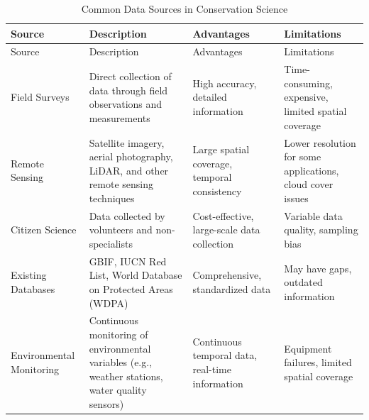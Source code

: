 \documentclass[
  letterpaper,
]{book}
\begin{document}
\begin{longtable}[]{@{}
  >{\raggedright\arraybackslash}p{}
  >{\raggedright\arraybackslash}p{}
  >{\raggedright\arraybackslash}p{}
  >{\raggedright\arraybackslash}p{}@{}}
\caption{Common Data Sources in Conservation Science}\tabularnewline
\toprule\noalign{}
\begin{minipage}[b]{\linewidth}\raggedright
Source
\end{minipage} & \begin{minipage}[b]{\linewidth}\raggedright
Description
\end{minipage} & \begin{minipage}[b]{\linewidth}\raggedright
Advantages
\end{minipage} & \begin{minipage}[b]{\linewidth}\raggedright
Limitations
\end{minipage} \\
\midrule\noalign{}
\endfirsthead
\toprule\noalign{}
\begin{minipage}[b]{\linewidth}\raggedright
Source
\end{minipage} & \begin{minipage}[b]{\linewidth}\raggedright
Description
\end{minipage} & \begin{minipage}[b]{\linewidth}\raggedright
Advantages
\end{minipage} & \begin{minipage}[b]{\linewidth}\raggedright
Limitations
\end{minipage} \\
\midrule\noalign{}
\endhead
\bottomrule\noalign{}
\endlastfoot
Field Surveys & Direct collection of data through field observations and
measurements & High accuracy, detailed information & Time-consuming,
expensive, limited spatial coverage \\
Remote Sensing & Satellite imagery, aerial photography, LiDAR, and other
remote sensing techniques & Large spatial coverage, temporal consistency
& Lower resolution for some applications, cloud cover issues \\
Citizen Science & Data collected by volunteers and non-specialists &
Cost-effective, large-scale data collection & Variable data quality,
sampling bias \\
Existing Databases & GBIF, IUCN Red List, World Database on Protected
Areas (WDPA) & Comprehensive, standardized data & May have gaps,
outdated information \\
Environmental Monitoring & Continuous monitoring of environmental
variables (e.g., weather stations, water quality sensors) & Continuous
temporal data, real-time information & Equipment failures, limited
spatial coverage \\
\end{longtable}
\end{document}
